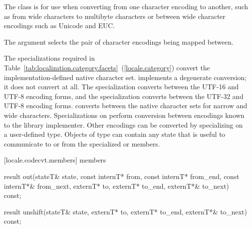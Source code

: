 \pnum
The class
is for use when
converting from one character encoding to another, such as from wide characters
to multibyte  characters or between wide character encodings such as
Unicode and EUC.

\pnum
The
argument selects the pair of character encodings being mapped between.

\pnum
The specializations required in Table~\ref{tab:localization.category.facets}~(\ref{locale.category})
convert the implementation-defined native character set.
implements a degenerate conversion;
it does not convert at all.
The specialization  
converts between the UTF-16 and UTF-8 encoding forms, and
the specialization  
converts between the UTF-32 and UTF-8 encoding forms.
converts between the native character sets for narrow and wide characters.
Specializations on
perform conversion between encodings known to the library implementer.
Other encodings can be converted by specializing on a user-defined
type.
Objects of type
can contain any state that is useful to communicate to or from
the specialized
or
members.

[locale.codecvt.members]{ members}

%
\begin{itemdecl}
result out(stateT& state,
  const internT* from, const internT* from_end, const internT*& from_next,
        externT* to, externT* to_end, externT*& to_next) const;
\end{itemdecl}

\begin{itemdescr}
\pnum
\returns
{}
\end{itemdescr}

%
\begin{itemdecl}
result unshift(stateT& state,
        externT* to, externT* to_end, externT*& to_next) const;
\end{itemdecl}

\begin{itemdescr}
\pnum
\returns
{}
\end{itemdescr}

